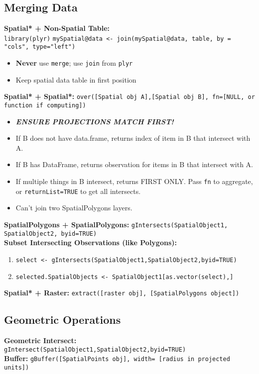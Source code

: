 \documentclass[10pt]{article}
\begin{document}
\hrulefill 
\subsection*{Merging Data}

\textbf{Spatial* + Non-Spatial Table:} \\
\texttt{library(plyr)}
\texttt{mySpatial@data <- join(mySpatial@data, table, by = "cols", type="left")}
\begin{itemize}
	\item \textbf{Never} use \texttt{merge}; use \texttt{join} from \texttt{plyr}
	\item Keep spatial data table in first position
\end{itemize}
\textbf{Spatial* + Spatial*:} \texttt{over([Spatial obj A],[Spatial obj B], fn=[NULL, or function if computing])}
\begin{itemize}
	\item \textbf\emph{{ENSURE PROJECTIONS MATCH FIRST!}}
	\item If B does not have data.frame, returns index of item in B that intersect with A. 
	\item If B has DataFrame, returns observation for items in B that intersect with A. 
	\item If multiple things in B intersect, returns FIRST ONLY. Pass \texttt{fn} to aggregate, or \texttt{returnList=TRUE} to get all intersects. 
	\item Can't join two SpatialPolygons layers. 
\end{itemize}
\textbf{SpatialPolygons + SpatialPolygons:} \texttt{gIntersects(SpatialObject1, SpatialObject2, byid=TRUE)}\\
\textbf{Subset Intersecting Observations (like Polygons):}
\begin{enumerate}
	\item \texttt{select <- gIntersects(SpatialObject1,SpatialObject2,byid=TRUE)} 
	\item \texttt{selected.SpatialObjects <- SpatialObject1[as.vector(select),]}
\end{enumerate} 
\textbf{Spatial* + Raster:} \texttt{extract([raster obj], [SpatialPolygons object])}


\hrulefill 
\subsection*{Geometric Operations}
\textbf{Geometric Intersect:} \texttt{gIntersect(SpatialObject1,SpatialObject2,byid=TRUE)}\\
\textbf{Buffer:} \texttt{gBuffer([SpatialPoints obj], width= [radius in projected units])}\\
\end{document}
